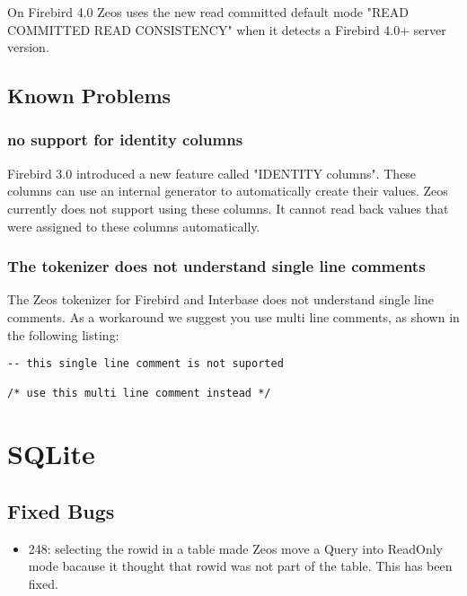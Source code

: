 \documentclass[a4paper,12pt,oneside]{book}
\begin{document}
On Firebird 4.0 Zeos uses the new read committed default mode "READ COMMITTED READ CONSISTENCY" when it detects a Firebird 4.0+ server version.

\subsection{Known Problems}
\label{sec:Rev6_FirebirdInterbase_KnownProblems}

\subsubsection{no support for identity columns}
\label{sec:Rev6_FirebirdInterbase_KnownProblems_IdentityColumns}

Firebird 3.0 introduced a new feature called "IDENTITY columns".
These columns can use an internal generator to automatically create their values.
Zeos currently does not support using these columns.
It cannot read back values that were assigned to these columns automatically.

\subsubsection{The tokenizer does not understand single line comments}
\label{sec:Rev6_FirebirdInterbase_KnownProblems_TokenizerSingleLineComments}

The Zeos tokenizer for Firebird and Interbase does not understand single line comments.
As a workaround we suggest you use multi line comments, as shown in the following listing:

\begin{lstlisting}
-- this single line comment is not suported

/* use this multi line comment instead */
\end{lstlisting}

\section{SQLite}
\label{sec:Rev6_SQLite}

\subsection{Fixed Bugs}
\label{sec:Rev6_SQLite_FixedBugs}

\begin{itemize}
\item	
  248: selecting the rowid in a table made Zeos move a Query into ReadOnly mode bacause it thought that rowid was not part of the table.
	This has been fixed.
\end{itemize}
\end{document}

